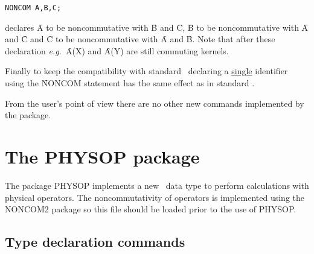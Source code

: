 \begin{verbatim}
NONCOM A,B,C;
\end{verbatim}
declares \f{A}  to be noncommutative with \f{B} and \f{C},
\f{B} to be noncommutative
with \f{A} and \f{C} and \f{C} to be noncommutative
with \f{A} and \f{B}.
Note that after these declaration
{\em e.g.\ }\f{A(X)} and \f{A(Y)}
are still commuting kernels.

Finally to keep the compatibility with standard \REDUCE\, declaring a
\underline{single} identifier using the \f{NONCOM} statement has the same
effect as in
standard \REDUCE.

From the user's point of view there are no other
new commands implemented by the package.


\section{The PHYSOP package}

The package PHYSOP implements a new \REDUCE\ data type to perform
calculations with physical operators.  The noncommutativity of
operators is
implemented using the NONCOM2 package so this file should be loaded
prior to the use of PHYSOP.

\subsection{Type declaration commands}

